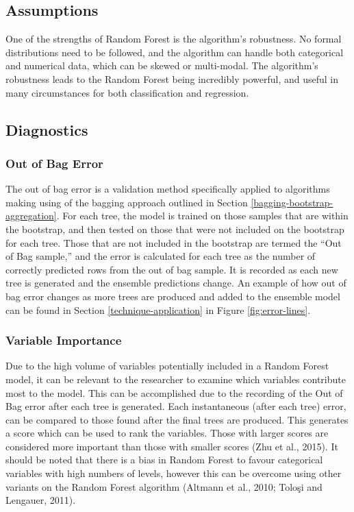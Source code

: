 \documentclass[
]{article}
\begin{document}
\hypertarget{assumptions}{%
\subsection{Assumptions}\label{assumptions}}

One of the strengths of Random Forest is the algorithm's robustness. No formal distributions need to be followed, and the algorithm can handle both categorical and numerical data, which can be skewed or multi-modal. The algorithm's robustness leads to the Random Forest being incredibly powerful, and useful in many circumstances for both classification and regression.

\hypertarget{diagnostics}{%
\subsection{Diagnostics}\label{diagnostics}}

\hypertarget{out-of-bag-error}{%
\subsubsection{Out of Bag Error}\label{out-of-bag-error}}

The out of bag error is a validation method specifically applied to algorithms making using of the bagging approach outlined in Section \ref{bagging-bootstrap-aggregation}. For each tree, the model is trained on those samples that are within the bootstrap, and then tested on those that were not included on the bootstrap for each tree. Those that are not included in the bootstrap are termed the ``Out of Bag sample,'' and the error is calculated for each tree as the number of correctly predicted rows from the out of bag sample. It is recorded as each new tree is generated and the ensemble predictions change. An example of how out of bag error changes as more trees are produced and added to the ensemble model can be found in Section \ref{technique-application} in Figure \ref{fig:error-lines}.

\hypertarget{variable-importance}{%
\subsubsection{Variable Importance}\label{variable-importance}}

Due to the high volume of variables potentially included in a Random Forest model, it can be relevant to the researcher to examine which variables contribute most to the model. This can be accomplished due to the recording of the Out of Bag error after each tree is generated. Each instantaneous (after each tree) error, can be compared to those found after the final trees are produced. This generates a score which can be used to rank the variables. Those with larger scores are considered more important than those with smaller scores (Zhu et al., 2015). It should be noted that there is a bias in Random Forest to favour categorical variables with high numbers of levels, however this can be overcome using other variants on the Random Forest algorithm (Altmann et al., 2010; Toloşi and Lengauer, 2011).
\end{document}
